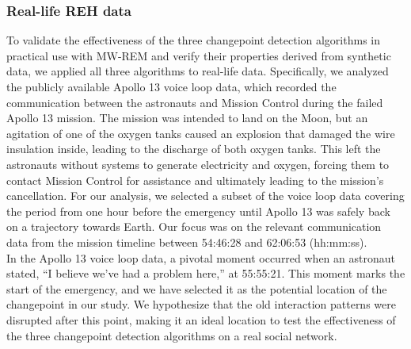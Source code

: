 \documentclass[]{interact}
\theoremstyle{plain}%
\theoremstyle{definition}
\theoremstyle{remark}
\begin{document}
    \subsubsection{Real-life REH data} \label{sec:Apollo 13 intro}
    
    \hspace{0.2cm} To validate the effectiveness of the three changepoint detection algorithms in practical use with MW-REM and verify their properties derived from synthetic data, we applied all three algorithms to real-life data. Specifically, we analyzed the publicly available Apollo 13 voice loop data, which recorded the communication between the astronauts and Mission Control during the failed Apollo 13 mission. The mission was intended to land on the Moon, but an agitation of one of the oxygen tanks caused an explosion that damaged the wire insulation inside, leading to the discharge of both oxygen tanks. This left the astronauts without systems to generate electricity and oxygen, forcing them to contact Mission Control for assistance and ultimately leading to the mission's cancellation. For our analysis, we selected a subset of the voice loop data covering the period from one hour before the emergency until Apollo 13 was safely back on a trajectory towards Earth. Our focus was on the relevant communication data from the mission timeline between 54:46:28 and 62:06:53 (hh:mm:ss). \\
    
    In the Apollo 13 voice loop data, a pivotal moment occurred when an astronaut stated, ``I believe we've had a problem here,'' at 55:55:21. This moment marks the start of the emergency, and we have selected it as the potential location of the changepoint in our study. We hypothesize that the old interaction patterns were disrupted after this point, making it an ideal location to test the effectiveness of the three changepoint detection algorithms on a real social network. \\
    
\end{document}
